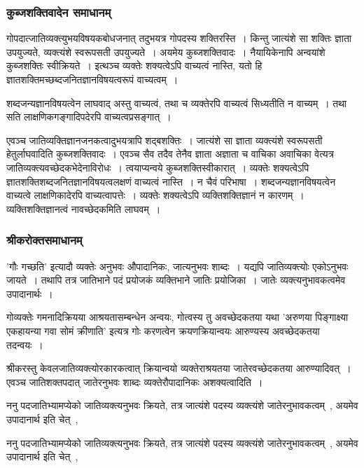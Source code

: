 			\subsubsection{कुब्जशक्तिवादेन समाधानम्}

				गोपदात्जातिव्यक्त्युभयविषयकबोधजनात् तदुभयत्र गोपदस्य शक्तिरस्ति~। किन्तु जात्यंशे सा शक्तिः ज्ञाता उपयुज्यते, व्यक्त्यंशे स्वरूपसती उपयुज्यते~। अयमेय कुब्जशक्तिवादः~। नैयायिकेनापि अन्वयांशे कुब्जशक्तिः स्वीक्रियते~। इत्थञ्च व्यक्तेः शक्यत्वेऽपि वाच्यत्वं नास्ति, यतो हि ज्ञातशक्तिमच्छब्दजनितज्ञानविषयत्वरूपं वाच्यत्वम्~।

				शब्दजन्यज्ञानविषयत्वेन लाघवाद् अस्तु वाच्यत्वं, तथा च व्यक्तेरपि वाच्यत्वं       सिध्यतीति न वाच्यम्~। तथा सति लाक्षणिकगङ्गादिपदेरपि वाच्यत्वप्रसङ्गात्~। 

				\begin{small}

					एवञ्च  जातिव्यक्तिज्ञानजनकत्वादुभयत्रापि शद्बशक्तिः~। जात्यंशे सा ज्ञाता व्यक्त्यंशे स्वरूपसती हेतुर्लाघवादिति कुब्जशक्तिवादः~। एवञ्च सैव तदैव तेनैव ज्ञाता अज्ञाता च वाचिका अवाचिका वेत्यत्र जातिव्यक्त्यवच्छेदकभेदेनाविरोधः~। त्वयाप्यन्वये कुब्जशक्तिस्वीकारात्~। व्यक्तेः शक्यत्वेऽपि ज्ञातशक्तिशब्दजनितज्ञानविषयत्वलक्षणं वाच्यत्वं नास्ति~। न चैवं परिभाषा~। शब्दजन्यज्ञानविषयत्वेन वाच्यत्वे लाक्षणिकादेरपि वाच्यत्वापत्तेः~। व्यक्तेः शक्यत्वेऽपि व्यक्तिशक्तिज्ञानं न कारणम्~। व्यक्तिशक्तिज्ञानत्वं नावच्छेदकमिति लाघवम्~।
				\end{small}

			\subsubsection{श्रीकरोक्तसमाधानम्}
			
				'गौः गच्छति' इत्यादौ व्यक्तेः अनुभवः औपादानिकः, जात्यनुभवः शाब्दः~। यद्यपि जातिव्यक्त्योः एकोऽनुभवः जायते~। तथापि तत्र जातिभाने पदं प्रयोजकं व्यक्तिभाने जातिः प्रयोजिका~। जातेः व्यक्त्यनुभावकत्वमेव उपादानार्थः~।

				गोव्यक्तेः गमनादिक्रियया आश्रयतासम्बन्धेन अन्वयः, गोत्वस्य तु अवच्छेदकतया यथा 'अरुणया पिङ्गाक्ष्या एकहायन्या गवा सोमं क्रीणाति' इत्यत्र गोः करणत्वेन क्रयणक्रियान्वयः आरुण्यस्य अवच्छेदकतया तदन्वयः~। 
	
				\begin{small}
					
					श्रीकरस्तु केवलजातिव्यक्त्योरकारकत्वात् क्रियान्वयो व्यक्तेराश्रयतया जातेरवच्छेदकतया आरुण्यादिवत्~। एवञ्च जातिशक्तपदात् जातेरनुभवः शाब्दः व्यक्तेरौपादानिकः अशक्यत्वादिति~। 
	
					ननु पदजातिभ्यामप्येको जातिव्यक्त्यनुभवः क्रियते, तत्र जात्यंशे पदस्य व्यक्त्यंशे जातेरनुभावकत्वम्~, अयमेव उपादानार्थ इति चेत्~, 

					ननु पदजातिभ्यामप्येको जातिव्यक्त्यनुभवः क्रियते, तत्र जात्यंशे पदस्य व्यक्त्यंशे जातेरनुभावकत्वम्~, अयमेव उपादानार्थ इति चेत्~, 
				\end{small}

